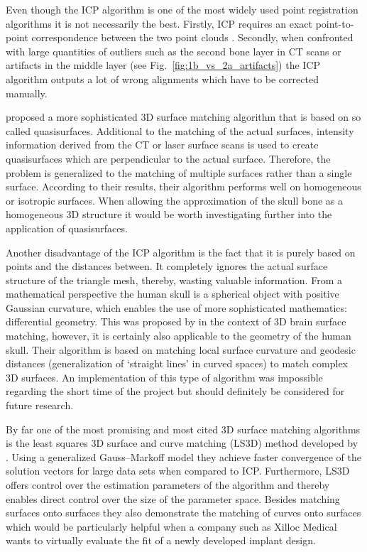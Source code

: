 \documentclass[a4paper]{article}
\begin{document}
Even though the ICP algorithm is one of the most widely used point registration algorithms it is not necessarily the best. Firstly, ICP requires an exact point-to-point correspondence between the two point clouds \citep{akca2007matching}. Secondly, when confronted with large quantities of outliers such as the second bone layer in CT scans or artifacts in the middle layer (see Fig.~\ref{fig:1b_vs_2a_artifacts}) the ICP algorithm outputs a lot of wrong alignments which have to be corrected manually.

\cite{akca2007matching} proposed a more sophisticated 3D surface matching algorithm that is based on so called quasisurfaces. Additional to the matching of the actual surfaces, intensity information derived from the CT or laser surface scans is used to create quasisurfaces which are perpendicular to the actual surface. Therefore, the problem is generalized to the matching of multiple surfaces rather than a single surface. According to their results, their algorithm performs well on homogeneous or isotropic surfaces. When allowing the approximation of the skull bone as a homogeneous 3D structure it would be worth investigating further into the application of quasisurfaces.

Another disadvantage of the ICP algorithm is the fact that it is purely based on points and the distances between. It completely ignores the actual surface structure of the triangle mesh, thereby, wasting valuable information. From a mathematical perspective the human skull is a spherical object with positive Gaussian curvature, which enables the use of more sophisticated mathematics: differential geometry. This was proposed by \cite{wang20033d} in the context of 3D brain surface matching, however, it is certainly also applicable to the geometry of the human skull. Their algorithm is based on matching local surface curvature and geodesic distances (generalization of ‘straight lines’ in curved spaces) to match complex 3D surfaces. An implementation of this type of algorithm was impossible regarding the short time of the project but should definitely be considered for future research.

By far one of the most promising and most cited 3D surface matching algorithms is the least squares 3D surface and curve matching (LS3D) method developed by \cite{gruen2005least}. Using a generalized Gauss–Markoff model they achieve faster convergence of the solution vectors for large data sets when compared to ICP. Furthermore, LS3D offers control over the estimation parameters of the algorithm and thereby enables direct control over the size of the parameter space. Besides matching surfaces onto surfaces they also demonstrate the matching of curves onto surfaces which would be particularly helpful when a company such as Xilloc Medical wants to virtually evaluate the fit of a newly developed implant design.
\end{document}
